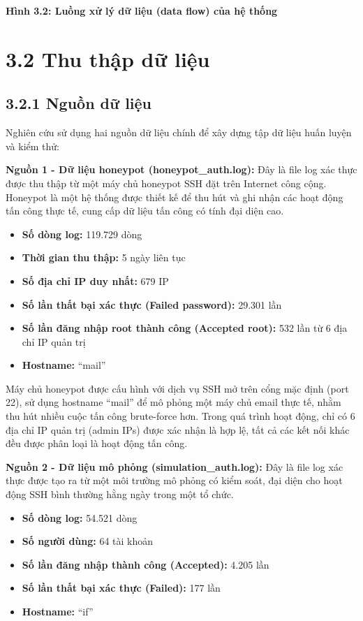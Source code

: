 \documentclass[
  a4paper]{report}
\providecommand{\tightlist}{%
  \setlength{\itemsep}{0pt}\setlength{\parskip}{0pt}}
\begin{document}
\textbf{Hình 3.2: Luồng xử lý dữ liệu (data flow) của hệ thống}

\section{3.2 Thu thập dữ liệu}\label{thu-thux1eadp-dux1eef-liux1ec7u}

\subsection{3.2.1 Nguồn dữ liệu}\label{nguux1ed3n-dux1eef-liux1ec7u}

Nghiên cứu sử dụng hai nguồn dữ liệu chính để xây dựng tập dữ liệu huấn
luyện và kiểm thử:

\textbf{Nguồn 1 - Dữ liệu honeypot (honeypot\_auth.log):} Đây là file
log xác thực được thu thập từ một máy chủ honeypot SSH đặt trên Internet
công cộng. Honeypot là một hệ thống được thiết kế để thu hút và ghi nhận
các hoạt động tấn công thực tế, cung cấp dữ liệu tấn công có tính đại
diện cao.

\begin{itemize}
\tightlist
\item
  \textbf{Số dòng log:} 119.729 dòng
\item
  \textbf{Thời gian thu thập:} 5 ngày liên tục
\item
  \textbf{Số địa chỉ IP duy nhất:} 679 IP
\item
  \textbf{Số lần thất bại xác thực (Failed password):} 29.301 lần
\item
  \textbf{Số lần đăng nhập root thành công (Accepted root):} 532 lần từ
  6 địa chỉ IP quản trị
\item
  \textbf{Hostname:} ``mail''
\end{itemize}

Máy chủ honeypot được cấu hình với dịch vụ SSH mở trên cổng mặc định
(port 22), sử dụng hostname ``mail'' để mô phỏng một máy chủ email thực
tế, nhằm thu hút nhiều cuộc tấn công brute-force hơn. Trong quá trình
hoạt động, chỉ có 6 địa chỉ IP quản trị (admin IPs) được xác nhận là hợp
lệ, tất cả các kết nối khác đều được phân loại là hoạt động tấn công.

\textbf{Nguồn 2 - Dữ liệu mô phỏng (simulation\_auth.log):} Đây là file
log xác thực được tạo ra từ một môi trường mô phỏng có kiểm soát, đại
diện cho hoạt động SSH bình thường hằng ngày trong một tổ chức.

\begin{itemize}
\tightlist
\item
  \textbf{Số dòng log:} 54.521 dòng
\item
  \textbf{Số người dùng:} 64 tài khoản
\item
  \textbf{Số lần đăng nhập thành công (Accepted):} 4.205 lần
\item
  \textbf{Số lần thất bại xác thực (Failed):} 177 lần
\item
  \textbf{Hostname:} ``if''
\end{itemize}
\end{document}
